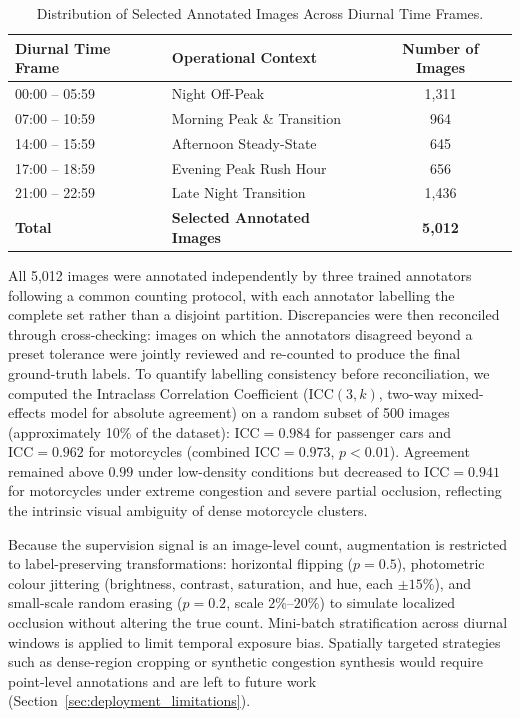 \documentclass[preprint,12pt]{elsarticle}
\begin{document}
\begin{table}[htbp]
    \centering
\footnotesize
\setlength{\tabcolsep}{6pt}
\renewcommand{\arraystretch}{1.15}
    \caption{Distribution of Selected Annotated Images Across Diurnal Time Frames.}
    \label{tab:time_distribution}
    \begin{tabular}{llc}
        \toprule
        \textbf{Diurnal Time Frame} & \textbf{Operational Context} & \textbf{Number of Images} \\
        \midrule
        00:00 -- 05:59 & Night Off-Peak & 1,311 \\
        07:00 -- 10:59 & Morning Peak \& Transition & 964 \\
        14:00 -- 15:59 & Afternoon Steady-State & 645 \\
        17:00 -- 18:59 & Evening Peak Rush Hour & 656 \\
        21:00 -- 22:59 & Late Night Transition & 1,436 \\
        \midrule
        \textbf{Total} & \textbf{Selected Annotated Images} & \textbf{5,012} \\
        \bottomrule
    \end{tabular}
\end{table}

All 5,012 images were annotated independently by three trained annotators following a common counting protocol, with each annotator labelling the complete set rather than a disjoint partition. Discrepancies were then reconciled through cross-checking: images on which the annotators disagreed beyond a preset tolerance were jointly reviewed and re-counted to produce the final ground-truth labels. To quantify labelling consistency before reconciliation, we computed the Intraclass Correlation Coefficient ($\text{ICC}(3,k)$, two-way mixed-effects model for absolute agreement) on a random subset of 500 images (approximately 10\% of the dataset): $\text{ICC}=0.984$ for passenger cars and $\text{ICC}=0.962$ for motorcycles (combined $\text{ICC}=0.973$, $p<0.01$). Agreement remained above $0.99$ under low-density conditions but decreased to $\text{ICC}=0.941$ for motorcycles under extreme congestion and severe partial occlusion, reflecting the intrinsic visual ambiguity of dense motorcycle clusters.

Because the supervision signal is an image-level count, augmentation is restricted to label-preserving transformations: horizontal flipping ($p=0.5$), photometric colour jittering (brightness, contrast, saturation, and hue, each $\pm 15\%$), and small-scale random erasing ($p=0.2$, scale $2\%$--$20\%$) to simulate localized occlusion without altering the true count. Mini-batch stratification across diurnal windows is applied to limit temporal exposure bias. Spatially targeted strategies such as dense-region cropping or synthetic congestion synthesis would require point-level annotations and are left to future work (Section~\ref{sec:deployment_limitations}).
\end{document}

